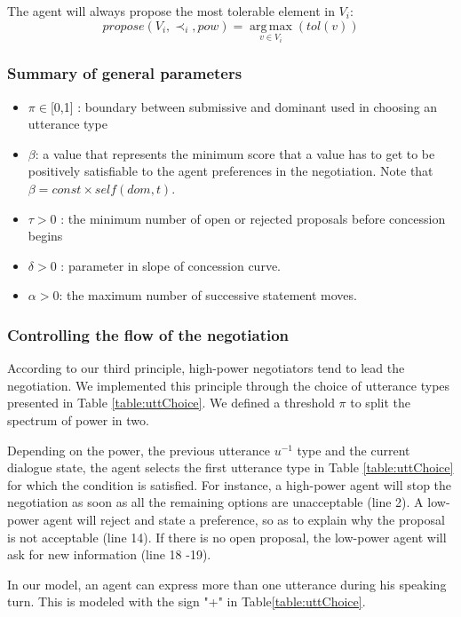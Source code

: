 \documentclass{llncs}
\begin{document}
		\noindent
		The agent will always propose the most tolerable element in $V_i$:
		\begin{equation}
			propose(V_i, \prec_i,pow) =  \operatorname*{arg\,max}_{v \in V_i} ( tol(v))
		\end{equation}

		\subsubsection*{Summary of general parameters }
	\begin{itemize}[noitemsep]
		
		\item $\pi \in $[0,1] : boundary between submissive and dominant used in
		choosing an utterance type
		\item $\beta$:  a value that represents the minimum score that a value has to get to be positively satisfiable to the agent preferences in the negotiation. Note that $\beta = const \times self(dom,t)$.
		\item $\tau > 0$ : the minimum number of open or rejected proposals before concession begins
		\item $\delta > 0$ : parameter in slope of concession curve.
		\item $\alpha> 0$: the maximum number of successive statement moves.
	\end{itemize}

		\subsubsection{Controlling the flow of the negotiation}
		According to our third principle, high-power negotiators tend to lead the negotiation. We implemented this principle through the choice of utterance types presented in Table \ref{table:uttChoice}.		
		We defined a threshold $\pi$ to split the spectrum of power in two.
		
		Depending on the power, the previous utterance $u^{-1}$ type and the current dialogue state, the agent selects the first utterance type in Table \ref{table:uttChoice} for which the condition is satisfied. For instance, a high-power agent will stop the negotiation as soon as all the remaining options are unacceptable (line 2). A low-power agent will reject and state a preference, so as to explain why the proposal is not acceptable (line 14). If there is no open proposal, the low-power agent will ask for new information (line 18 -19).
		
		In our model, an agent can express more than one utterance during his speaking turn. This is modeled  with the sign "+" in Table\ref{table:uttChoice}.
		
\end{document}

